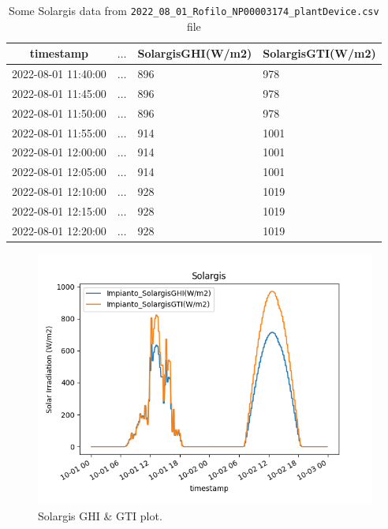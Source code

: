 \begin{table}[H]
	\begin{center}
		\begin{tabular}[c]{l|l|l|l}
			\hline
			\multicolumn{1}{c|}{\textbf{timestamp}}         &
			\multicolumn{1}{c|}{\textbf{$\ldots$}}          &
			\multicolumn{1}{c|}{\textbf{SolargisGHI(W/m2)}} &
			\multicolumn{1}{c}{\textbf{SolargisGTI(W/m2)}}                          \\
			\hline
			2022-08-01 11:40:00                             & $\ldots$ & 896 & 978  \\
			2022-08-01 11:45:00                             & $\ldots$ & 896 & 978  \\
			2022-08-01 11:50:00                             & $\ldots$ & 896 & 978  \\
			2022-08-01 11:55:00                             & $\ldots$ & 914 & 1001 \\
			2022-08-01 12:00:00                             & $\ldots$ & 914 & 1001 \\
			2022-08-01 12:05:00                             & $\ldots$ & 914 & 1001 \\
			2022-08-01 12:10:00                             & $\ldots$ & 928 & 1019 \\
			2022-08-01 12:15:00                             & $\ldots$ & 928 & 1019 \\
			2022-08-01 12:20:00                             & $\ldots$ & 928 & 1019 \\

			\hline
		\end{tabular}
		\caption{Some Solargis data from \texttt{2022\_08\_01\_Rofilo\_NP00003174\_plantDevice.csv} file}\label{tab:solargis}
	\end{center}
\end{table}

\begin{figure}[H]
	\centering
	\includegraphics[width=.7\linewidth]{chapters/1_introduction/imgs/solargis.png}
	\caption{Solargis GHI \& GTI plot.}
	\label{fig:solargisplot}
\end{figure}


